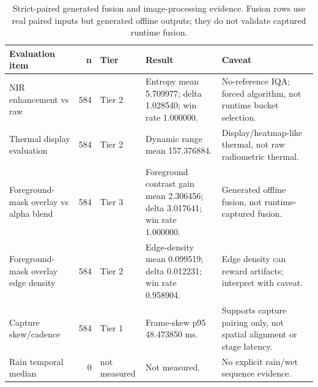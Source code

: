 \begin{table}[!htbp]
\centering
\footnotesize
\caption{Strict-paired generated fusion and image-processing evidence. Fusion rows use real paired inputs but generated offline outputs; they do not validate captured runtime fusion.}
\label{tab:ch6-fusion-generated-summary}
\begin{tabularx}{\textwidth}{@{}lrlXX@{}}
\hline
\textbf{Evaluation item} & \textbf{n} & \textbf{Tier} & \textbf{Result} & \textbf{Caveat} \\
\hline
NIR enhancement vs raw & 584 & Tier 2 & Entropy mean 5.709977; delta 1.028540; win rate 1.000000. & No-reference IQA; forced algorithm, not runtime bucket selection. \\
Thermal display evaluation & 584 & Tier 2 & Dynamic range mean 157.376884. & Display/heatmap-like thermal, not raw radiometric thermal. \\
Foreground-mask overlay vs alpha blend & 584 & Tier 3 & Foreground contrast gain mean 2.306456; delta 3.017641; win rate 1.000000. & Generated offline fusion, not runtime-captured fusion. \\
Foreground-mask overlay edge density & 584 & Tier 2 & Edge-density mean 0.099519; delta 0.012231; win rate 0.958904. & Edge density can reward artifacts; interpret with caveat. \\
Capture skew/cadence & 584 & Tier 1 & Frame-skew p95 48.473850 ms. & Supports capture pairing only, not spatial alignment or stage latency. \\
Rain temporal median & 0 & not measured & Not measured. & No explicit rain/wet sequence evidence. \\
\hline
\end{tabularx}
\end{table}
